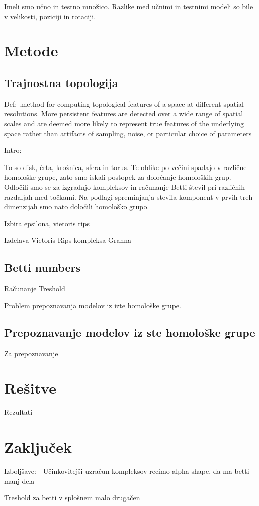 \documentclass[a4paper,11pt]{article}
\begin{document}
Imeli smo učno in testno množico. Razlike med učnimi in testnimi modeli so bile v velikosti, poziciji in rotaciji.

\section{Metode}

\subsection{Trajnostna topologija}

Def: .method for computing topological features of a space at different spatial resolutions. More persistent features are detected over a wide range of spatial scales and are deemed more likely to represent true features of the underlying space rather than artifacts of sampling, noise, or particular choice of parameters


Intro:

To so disk, črta, krožnica, sfera in torus. Te oblike po večini spadajo v različne homološke grupe, zato smo iskali postopek za določanje homoloških grup. Odločili smo se za izgradnjo kompleksov in računanje Betti števil pri različnih razdaljah med točkami. Na podlagi spreminjanja stevila komponent v prvih treh dimenzijah smo nato določili homološko grupo. 


Izbira epsilona, vietoris rips

Izdelava Vietoris-Rips kompleksa
Granna

\subsection{Betti numbers}
Računanje
Treshold

Problem prepoznavanja modelov iz izte homološke grupe.

\subsection{Prepoznavanje modelov iz ste homološke grupe}

Za prepoznavanje 

\section{Rešitve}

Rezultati


\section{Zaključek}

Izboljšave:
- Učinkovitejši uzračun kompleksov-recimo alpha shape, da ma betti manj dela

Treshold za betti v splošnem malo drugačen
\end{document}
